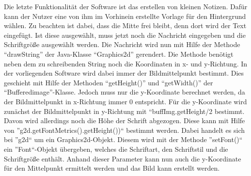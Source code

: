 \begin{flushleft}
Die letzte Funktionalität der Software ist das erstellen von kleinen Notizen. Dafür kann der Nutzer eine von ihm im Vorhinein erstellte Vorlage für den Hintergrund wählen. Zu beachten ist dabei, dass die Mitte frei bleibt, denn dort wird der Text eingefügt. Ist diese ausgewählt, muss jetzt noch die Nachricht eingegeben und die Schriftgröße ausgewählt werden. Die Nachricht wird nun mit Hilfe der Methode ``drawString'' der Java-Klasse ``Graphics2d'' gerendert. Die Methode benötigt neben dem zu schreibenden String noch die Koordinaten in x- und y-Richtung. In der vorliegenden Software wird dabei immer der Bildmittelpunkt bestimmt. Dies geschieht mit Hilfe der Methoden ``getHeight()'' und ``getWidth()'' der ``Bufferedimage''-Klasse. Jedoch muss nur die y-Koordinate berechnet werden, da der Bildmittelpunkt in x-Richtung immer 0 entspricht. Für die y-Koordinate wird zunächst der Bildmittelpunkt in y-Richtung mit ``buffImg.getHeight/2 bestimmt.
Davon wird allerdings noch die Höhe der Schrift abgezogen. Diese kann mit Hilfe von ''g2d.getFontMetrics().getHeight())`` bestimmt werden. Dabei handelt es sich bei ''g2d`` um ein Graphics2d-Objekt. Diesem wird mit der Methode ''setFont()`` ein ''Font``-Objekt übergeben, welches die Schriftart, den Schriftstil und die Schriftgröße enthält. Anhand dieser Parameter kann nun auch die y-Koordinate für den Mittelpunkt ermittelt werden und das Bild kann erstellt werden. 

\end{flushleft}